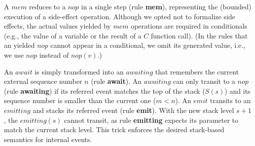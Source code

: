 \documentclass{acm_proc_article-sp}
\newcommand{\CEU}{\textsc{C\'{e}u}\xspace}
\newcommand{\code}[1] {{\small{\texttt{#1}}}}
\newcommand{\1}{\;}
\newcommand{\2}{\;\;}
\newcommand{\3}{\;\;\;}
\newcommand{\5}{\;\;\;\;\;}
\begin{document}
A $mem$ reduces to a $nop$ in a single step (rule \textbf{mem}), representing 
the (bounded) execution of a side-effect operation.
Although we opted not to formalize side effects, the actual values yielded by 
$mem$ operations are required in conditionals (e.g., the value of a variable or 
the result of a $C$ function call).
(In the rules that an yielded $nop$ cannot appear in a conditional, we omit its 
generated value, i.e., we use $nop$ instead of $nop(v)$.)

An $await$ is simply transformed into an $awaiting$ that remembers the current 
external sequence number $n$ (rule \textbf{await}).
An $awaiting$ can only transit to a $nop$ (rule \textbf{awaiting}) if its 
referred event matches the top of the stack ($S(s)$) and its sequence number is 
smaller than the current one ($m<n$).
%
%
An $emit$ transits to an $emitting$ and stacks its referred event (rule 
\textbf{emit}).
With the new stack level $s+1$, the $emitting(s)$ cannot transit, as rule 
\textbf{emitting} expects its parameter to match the current stack level.
This trick enforces the desired stack-based semantics for internal events.
\end{document}
